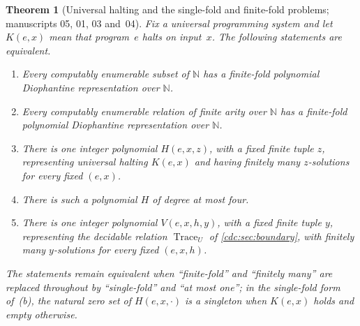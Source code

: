 \documentclass[11pt,a4paper]{article}
\newtheorem{theorem}{Theorem}[section]
\theoremstyle{definition}
\theoremstyle{remark}
\newcommand{\N}{\mathbb N}
\begin{document}
\begin{theorem}[Universal halting and the single-fold and finite-fold problems; manuscripts 05, 01, 03 and~04]\label{cdc:bd:thm:universal}\label{cdc:thm:boundary}\label{cdc:ct:thm:universal}\label{cdc:mem:thm:compression}\label{cdc:wf:thm:universal}
Fix a universal programming system and let $K(e,x)$ mean that program~$e$ halts on input~$x$. The following statements are equivalent.
\begin{enumerate}[label=\textup{(\alph*)}]
\item Every computably enumerable subset of $\N$ has a finite-fold polynomial Diophantine representation over $\N$.
\item[\textup{(a$'$)}] Every computably enumerable relation of finite arity over $\N$ has a finite-fold polynomial Diophantine representation over $\N$.
\item There is one integer polynomial $H(e,x,z)$, with a fixed finite tuple $z$, representing universal halting $K(e,x)$ and having finitely many $z$-solutions for every fixed $(e,x)$.
\item[\textup{(b$'$)}] There is such a polynomial $H$ of degree at most four.
\item There is one integer polynomial $V(e,x,h,y)$, with a fixed finite tuple $y$, representing the decidable relation $\operatorname{Trace}_U$ of \cref{cdc:sec:boundary}, with finitely many $y$-solutions for every fixed $(e,x,h)$.
\end{enumerate}
The statements remain equivalent when ``finite-fold'' and ``finitely many'' are replaced throughout by ``single-fold'' and ``at most one''; in the single-fold form of~\textup{(b)}, the natural zero set of $H(e,x,\cdot)$ is a singleton when $K(e,x)$ holds and empty otherwise.
\end{theorem}
\end{document}
